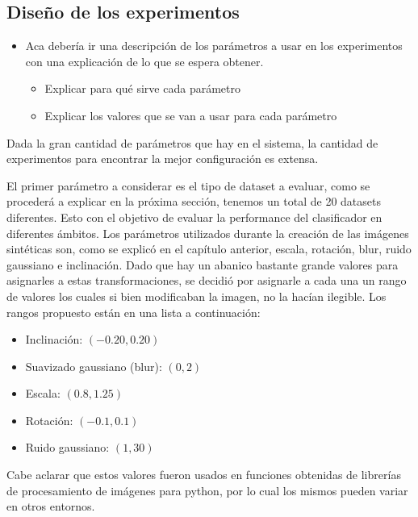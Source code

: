 \subsection{Diseño de los experimentos}

	\begin{itemize}
		\item Aca debería ir una descripción de los parámetros a usar en los experimentos con una explicación de lo que se espera obtener.
		\begin{itemize}
			\item Explicar para qué sirve cada parámetro
			\item Explicar los valores que se van a usar para cada parámetro
		\end{itemize}
	\end{itemize}

	Dada la gran cantidad de parámetros que hay en el sistema, la cantidad de experimentos para encontrar la mejor configuración es extensa.
	
	El primer parámetro a considerar es el tipo de dataset a evaluar, como se procederá a explicar en la próxima sección, tenemos un total de 20 datasets diferentes. Esto con el objetivo de evaluar la performance del clasificador en diferentes ámbitos. Los parámetros utilizados durante la creación de las imágenes sintéticas son, como se explicó en el capítulo anterior, escala, rotación, blur, ruido gaussiano e inclinación. Dado que hay un abanico bastante grande valores para asignarles a estas transformaciones, se decidió por asignarle a cada una un rango de valores los cuales si bien modificaban la imagen, no la hacían ilegible. Los rangos propuesto están en una lista a continuación:
	\begin{itemize}
		\item Inclinación: $(-0.20, 0.20)$
		\item Suavizado gaussiano (blur): $(0, 2)$
		\item Escala: $(0.8, 1.25)$
		\item Rotación: $(-0.1, 0.1)$
		\item Ruido gaussiano: $(1, 30)$
	\end{itemize}
	
	Cabe aclarar que estos valores fueron usados en funciones obtenidas de librerías de procesamiento de imágenes para python, por lo cual los mismos pueden variar en otros entornos.
	
